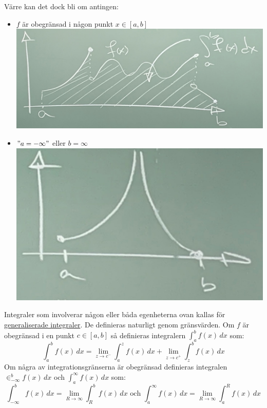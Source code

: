 Värre kan det dock bli om antingen:
\begin{itemize}
    \item $f$ är obegränsad i någon punkt $x\in[a,b]$ \includegraphics[scale=0.05]{lessons/lesson18/imgs/img02.jpg}%
    \item $"a=-\infty"$ eller $b=\infty$ \includegraphics[scale=0.05]{lessons/lesson18/imgs/img03.jpg}%
\end{itemize}
Integraler som involverar någon eller båda egenheterna ovan kallas för \\
\underline{generaliserade integraler}.
De definieras naturligt genom gränsvärden.
Om $f$ är obegränsad i en punkt $c\in[a,b]$ så definieras integralern $\int_a^b f(x)\, dx$ som:
\begin{equation*}
    \int_a^b f(x)\, dx =\lim_{z\to c^-}\int_a^z f(x)\, dx+ \lim_{z\to c^+}\int_z^b f(x)\, dx
\end{equation*}
Om några av integrationsgränserna är obegränsad definieras integralen $\in_{-\infty}^b f(x)\, dx$
och $\int_a^\infty f(x)\, dx$ som:
\begin{equation*}
    \int_{-\infty}^b f(x)\, dx=\lim_{R\to \infty}\int_R^b f(x)\, dx\text{ och }\int_a^\infty f(x)\, dx=\lim_{R\to \infty}\int_a^R f(x)\, dx
\end{equation*}
